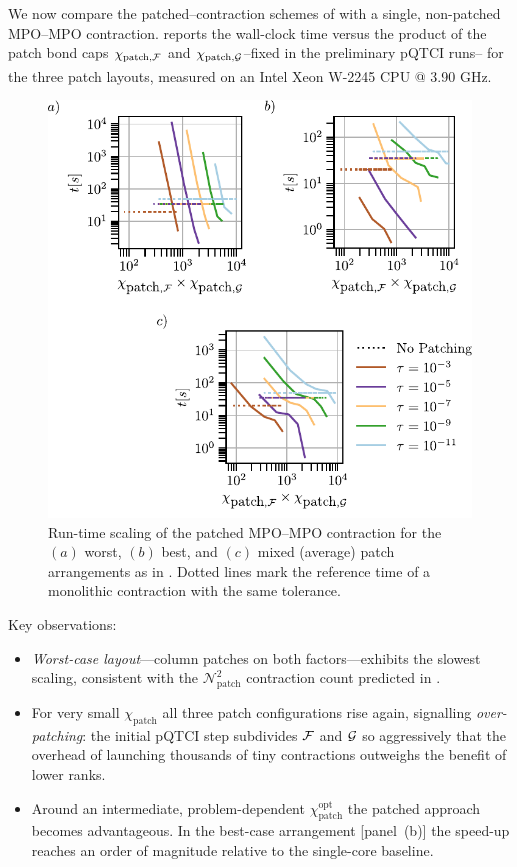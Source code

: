 We now compare the patched–contraction schemes of  with a single, non-patched MPO–MPO contraction.  
 reports the wall-clock time versus the product of the  patch bond caps \(\chi_{\text{patch}, \mathcal{F}}\) and  \(\chi_{\text{patch}, \mathcal{G}}\)--fixed in the preliminary pQTCI runs-- for the three patch layouts, measured on an Intel\textsuperscript{\textregistered}  Xeon\textsuperscript{\textregistered} W-2245 CPU @ 3.90 GHz.
\begin{figure}[htbp]
    \centering
    \includegraphics{figures/patchedMulResults.pdf}
    \caption{ Run-time scaling of the patched MPO–MPO contraction for the $(a)$ worst,
    $(b)$ best, and $(c)$ mixed (average) patch arrangements as in . Dotted lines mark the reference time of a monolithic contraction with the same tolerance. }
    \label{fig:patchedMulResults}
\end{figure}

Key observations:

\begin{itemize}
    \item \emph{Worst-case layout}—column patches on both factors—exhibits the slowest scaling, consistent with the \(\mathcal N_{\text{patch}}^{2}\) contraction count predicted in .
    \item For very small \(\chi_{\text{patch}}\) all three patch configurations rise again, signalling \emph{over-patching}: the initial pQTCI step subdivides \(\mathcal{F}\) and \(\mathcal{G}\) so aggressively that the overhead of launching thousands of tiny contractions outweighs the benefit of lower ranks.
    \item Around an intermediate, problem-dependent \(\chi_{\text{patch}}^{\mathrm{opt}}\) the patched approach becomes advantageous.  In the best-case arrangement [panel~(b)] the speed-up reaches an order of magnitude relative to the single-core baseline.
\end{itemize}

